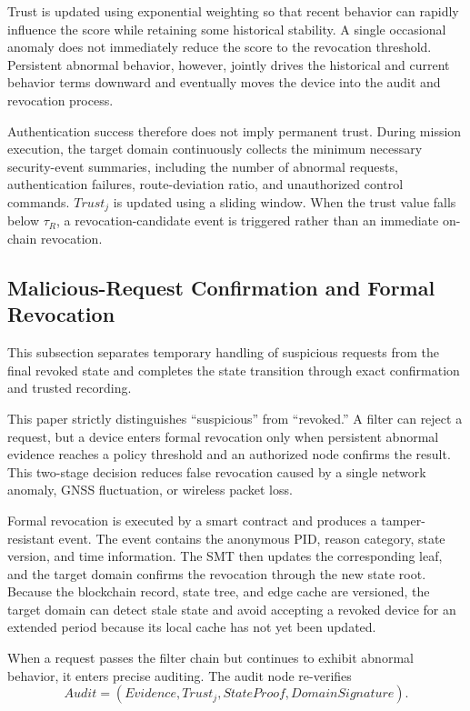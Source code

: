 \documentclass[lettersize,journal]{IEEEtran}
\begin{document}
	Trust is updated using exponential weighting so that recent behavior can rapidly influence the score while retaining some historical stability. A single occasional anomaly does not immediately reduce the score to the revocation threshold. Persistent abnormal behavior, however, jointly drives the historical and current behavior terms downward and eventually moves the device into the audit and revocation process.
	
	Authentication success therefore does not imply permanent trust. During mission execution, the target domain continuously collects the minimum necessary security-event summaries, including the number of abnormal requests, authentication failures, route-deviation ratio, and unauthorized control commands. $Trust_j$ is updated using a sliding window. When the trust value falls below $\tau_R$, a revocation-candidate event is triggered rather than an immediate on-chain revocation.
	
	\subsection{Malicious-Request Confirmation and Formal Revocation}
	This subsection separates temporary handling of suspicious requests from the final revoked state and completes the state transition through exact confirmation and trusted recording.
	
	
	This paper strictly distinguishes ``suspicious'' from ``revoked.'' A filter can reject a request, but a device enters formal revocation only when persistent abnormal evidence reaches a policy threshold and an authorized node confirms the result. This two-stage decision reduces false revocation caused by a single network anomaly, GNSS fluctuation, or wireless packet loss.
	
	Formal revocation is executed by a smart contract and produces a tamper-resistant event. The event contains the anonymous PID, reason category, state version, and time information. The SMT then updates the corresponding leaf, and the target domain confirms the revocation through the new state root. Because the blockchain record, state tree, and edge cache are versioned, the target domain can detect stale state and avoid accepting a revoked device for an extended period because its local cache has not yet been updated.
	
	When a request passes the filter chain but continues to exhibit abnormal behavior, it enters precise auditing. The audit node re-verifies
	\begin{equation}
		Audit=(Evidence,Trust_j,StateProof,DomainSignature).
	\end{equation}
	
\end{document}
